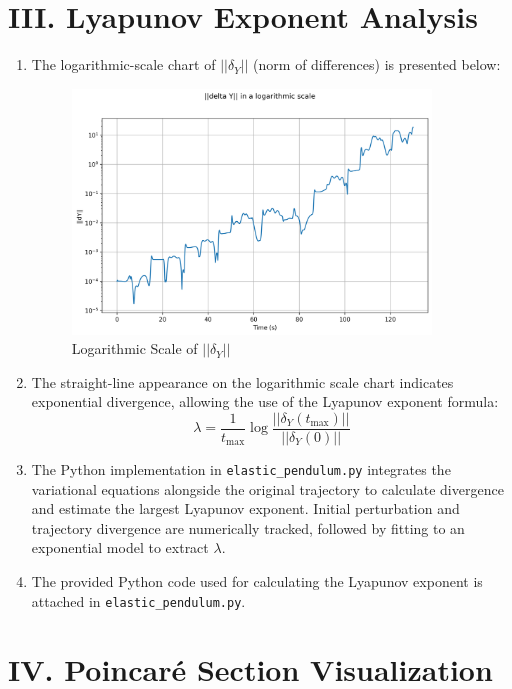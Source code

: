 \documentclass{article}
\begin{document}
	\section*{III. Lyapunov Exponent Analysis}
	
	\begin{enumerate}
		\item The logarithmic-scale chart of $||\delta_Y||$ (norm of differences) is presented below:
		
		\begin{figure}[h!]
			\centering
			\includegraphics[width=0.9\textwidth]{norma_of_delta_Y.png}
			\caption{Logarithmic Scale of $||\delta_Y||$}
		\end{figure}
		
		\item The straight-line appearance on the logarithmic scale chart indicates exponential divergence, allowing the use of the Lyapunov exponent formula:
		\[
		\lambda = \frac{1}{t_{\text{max}}}\log\frac{||\delta_Y(t_{\text{max}})||}{||\delta_Y(0)||}
		\]
		
		\item The Python implementation in \texttt{elastic\_pendulum.py} integrates the variational equations alongside the original trajectory to calculate divergence and estimate the largest Lyapunov exponent. Initial perturbation and trajectory divergence are numerically tracked, followed by fitting to an exponential model to extract $\lambda$.
		
		\item The provided Python code used for calculating the Lyapunov exponent is attached in \texttt{elastic\_pendulum.py}.
	\end{enumerate}
	
	\section*{IV. Poincaré Section Visualization}
	
\end{document}
